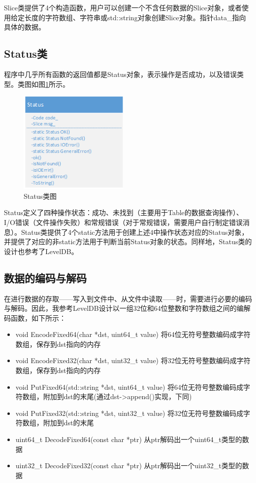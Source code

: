 \documentclass[bachelor]{thesis-uestc}
\begin{document}
Slice类提供了4个构造函数，用户可以创建一个不含任何数据的Slice对象，或者使用给定长度的字符数组、字符串或std::string对象创建Slice对象。指针data\_指向具体的数据。

\subsection{Status类}
程序中几乎所有函数的返回值都是Status对象，表示操作是否成功，以及错误类型。类图如图\ref{fig:status}所示。

\begin{figure}[htbp]
	\centering\includegraphics[height=5cm]{images/status.png}
	\caption{Status类图}
	\label{fig:status}
\end{figure}

Status定义了四种操作状态：成功、未找到（主要用于Table的数据查询操作）、I/O错误（文件操作失败）和常规错误（对于常规错误，需要用户自行制定错误消息）。Status类提供了4个static方法用于创建上述4中操作状态对应的Status对象，并提供了对应的非static方法用于判断当前Status对象的状态。同样地，Status类的设计也参考了LevelDB。

\subsection{数据的编码与解码}
在进行数据的存取——写入到文件中、从文件中读取——时，需要进行必要的编码与解码。因此，我参考LevelDB设计以一组32位和64位整数和字符数组之间的编解码函数，如下所示：

\begin{itemize}
	\item void EncodeFixed64(char *dst, uint64\_t value) 将64位无符号整数编码成字符数组，保存到dst指向的内存
	\item void EncodeFixed32(char *dst, uint32\_t value) 将32位无符号整数编码成字符数组，保存到dst指向的内存
	\item void PutFixed64(std::string *dst, uint64\_t value) 将64位无符号整数编码成字符数组，附加到dst的末尾(通过dst->append()实现，下同)
	\item void PutFixed32(std::string *dst, uint32\_t value) 将32位无符号整数编码成字符数组，附加到dst的末尾
	\item uint64\_t DecodeFixed64(const char *ptr) 从ptr解码出一个uint64\_t类型的数据
	\item uint32\_t DecodeFixed32(const char *ptr) 从ptr解码出一个uint32\_t类型的数据
\end{itemize}
\end{document}
